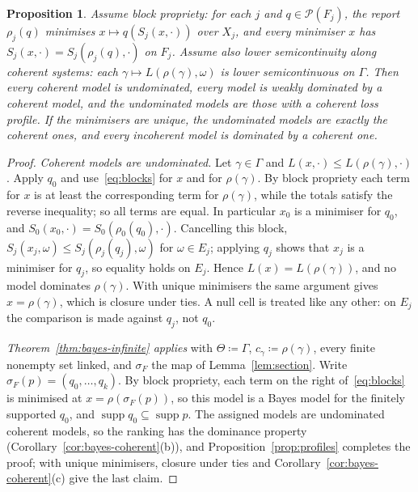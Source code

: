 \documentclass[11pt]{article}
\newtheorem{proposition}[theorem]{Proposition}
\theoremstyle{definition}
\theoremstyle{remark}
\newcommand{\PP}{\mathcal P}
\newcommand{\supp}{\operatorname{supp}}
\begin{document}
\begin{proposition}\label{prop:blocks}
Assume \emph{block propriety}: for each $j$ and $q\in\PP(F_j)$, the report $\rho_j(q)$ minimises $x\mapsto q(S_j(x,\cdot))$ over $X_j$, and every minimiser $x$ has $S_j(x,\cdot)=S_j(\rho_j(q),\cdot)$ on $F_j$. Assume also \emph{lower semicontinuity along coherent systems}: each $\gamma\mapsto L(\rho(\gamma),\omega)$ is lower semicontinuous on $\Gamma$. Then every coherent model is undominated, every model is weakly dominated by a coherent model, and the undominated models are those with a coherent loss profile. If the minimisers are unique, the undominated models are exactly the coherent ones, and every incoherent model is dominated by a coherent one.
\end{proposition}
\begin{proof}
\emph{Coherent models are undominated.} Let $\gamma\in\Gamma$ and $L(x,\cdot)\le L(\rho(\gamma),\cdot)$. Apply $q_0$ and use~\eqref{eq:blocks} for $x$ and for $\rho(\gamma)$. By block propriety each term for $x$ is at least the corresponding term for $\rho(\gamma)$, while the totals satisfy the reverse inequality; so all terms are equal. In particular $x_0$ is a minimiser for $q_0$, and $S_0(x_0,\cdot)=S_0(\rho_0(q_0),\cdot)$. Cancelling this block, $S_j(x_j,\omega)\le S_j(\rho_j(q_j),\omega)$ for $\omega\in E_j$; applying $q_j$ shows that $x_j$ is a minimiser for $q_j$, so equality holds on $E_j$. Hence $L(x)=L(\rho(\gamma))$, and no model dominates $\rho(\gamma)$. With unique minimisers the same argument gives $x=\rho(\gamma)$, which is closure under ties. A null cell is treated like any other: on $E_j$ the comparison is made against $q_j$, not $q_0$.

\emph{Theorem~\ref{thm:bayes-infinite} applies} with $\Theta\coloneqq\Gamma$, $c_\gamma\coloneqq\rho(\gamma)$, every finite nonempty set linked, and $\sigma_F$ the map of Lemma~\ref{lem:section}. Write $\sigma_F(p)=(q_0,\dots,q_k)$. By block propriety, each term on the right of~\eqref{eq:blocks} is minimised at $x=\rho(\sigma_F(p))$, so this model is a Bayes model for the finitely supported $q_0$, and $\supp q_0\subseteq\supp p$. The assigned models are undominated coherent models, so the ranking has the dominance property (Corollary~\ref{cor:bayes-coherent}(b)), and Proposition~\ref{prop:profiles} completes the proof; with unique minimisers, closure under ties and Corollary~\ref{cor:bayes-coherent}(c) give the last claim.
\end{proof}
\end{document}
